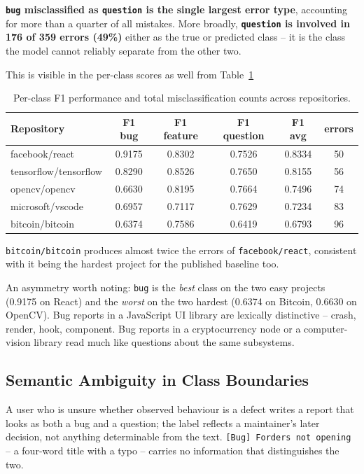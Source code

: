 \textbf{\texttt{bug} misclassified as \texttt{question} is the single largest error type}, accounting for more than a quarter of all mistakes. More broadly, \textbf{\texttt{question} is involved in 176 of 359 errors (49\%)} either as the true or predicted class -- it is the class the model cannot reliably separate from the other two.

This is visible in the per-class scores as well from Table~\ref{tab:per_repo_f1_errors}

\begin{table}[H]
\centering
\caption{Per-class F1 performance and total misclassification counts across repositories.}
\label{tab:per_repo_f1_errors}
\vspace{0.5em}
\begin{tabular}{l c c c c c}
\hline
Repository & F1 bug & F1 feature & F1 question & F1 avg & errors \\
\hline
facebook/react & 0.9175 & 0.8302 & 0.7526 & 0.8334 & 50 \\
tensorflow/tensorflow & 0.8290 & 0.8526 & 0.7650 & 0.8155 & 56 \\
opencv/opencv & 0.6630 & 0.8195 & 0.7664 & 0.7496 & 74 \\
microsoft/vscode & 0.6957 & 0.7117 & 0.7629 & 0.7234 & 83 \\
bitcoin/bitcoin & 0.6374 & 0.7586 & 0.6419 & 0.6793 & 96 \\
\hline
\end{tabular}
\end{table}

\texttt{bitcoin/bitcoin} produces almost twice the errors of \texttt{facebook/react}, consistent with it being the hardest project for the published baseline too.

An asymmetry worth noting: \texttt{bug} is the \textit{best} class on the two easy projects (0.9175 on React) and the \textit{worst} on the two hardest (0.6374 on Bitcoin, 0.6630 on OpenCV). Bug reports in a JavaScript UI library are lexically distinctive -- crash, render, hook, component. Bug reports in a cryptocurrency node or a computer-vision library read much like questions about the same subsystems.

\subsection{Semantic Ambiguity in Class Boundaries}

A user who is unsure whether observed behaviour is a defect writes a report that looks as both a bug and a question; the label reflects a maintainer's later decision, not anything determinable from the text. \texttt{[Bug] Forders not opening} -- a four-word title with a typo -- carries no information that distinguishes the two.

